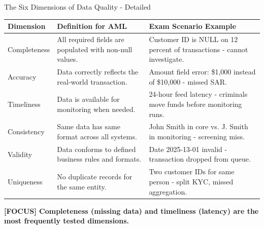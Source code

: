 \documentclass[11pt,a4paper]{beamer}
\newcommand{\examfocus}[1]{\textcolor{orange!80!black}{\textbf{[FOCUS] #1}}}
\begin{document}
	\begin{frame}{The Six Dimensions of Data Quality - Detailed}
		\begin{longtable}{p{}|p{}|p{}}
			\hline
			\rowcolor{lightgray}
			\textbf{Dimension} & \textbf{Definition for AML} & \textbf{Exam Scenario Example} \\
			\hline
			Completeness & All required fields are populated with non-null values. & Customer ID is NULL on 12 percent of transactions - cannot investigate. \\
			\hline
			Accuracy & Data correctly reflects the real-world transaction. & Amount field error: \$1,000 instead of \$10,000 - missed SAR. \\
			\hline
			Timeliness & Data is available for monitoring when needed. & 24-hour feed latency - criminals move funds before monitoring runs. \\
			\hline
			Consistency & Same data has same format across all systems. & John Smith in core vs. J. Smith in monitoring - screening miss. \\
			\hline
			Validity & Data conforms to defined business rules and formats. & Date 2025-13-01 invalid - transaction dropped from queue. \\
			\hline
			Uniqueness & No duplicate records for the same entity. & Two customer IDs for same person - split KYC, missed aggregation. \\
			\hline
		\end{longtable}
		
		\examfocus{Completeness (missing data) and timeliness (latency) are the most frequently tested dimensions.}
	\end{frame}
	
\end{document}
